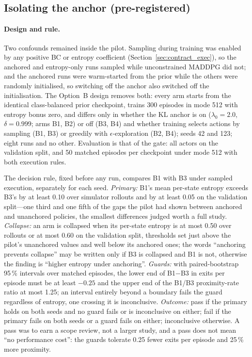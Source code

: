 \subsection{Isolating the anchor (pre-registered)}
\label{sec:anchor}

\paragraph{Design and rule.}
Two confounds remained inside the pilot. Sampling during training was enabled by any positive BC or entropy coefficient (Section~\ref{sec:contract_exec}), so the anchored and entropy-only runs sampled while unconstrained MADDPG did not; and the anchored runs were warm-started from the prior while the others were randomly initialised, so switching off the anchor also switched off the initialisation. The Option~B design removes both: every arm starts from the identical class-balanced prior checkpoint, trains 300 episodes in mode 512 with entropy bonus zero, and differs only in whether the KL anchor is on ($\lambda_0=2.0$, $\delta=0.999$; arms B1, B2) or off (B3, B4) and whether training selects actions by sampling (B1, B3) or greedily with $\epsilon$-exploration (B2, B4); seeds 42 and 123; eight runs and no other. Evaluation is that of the gate: all actors on the validation split, and 50 matched episodes per checkpoint under mode 512 with both execution rules.

The decision rule, fixed before any run, compares B1 with B3 under sampled execution, separately for each seed. \emph{Primary:} B1's mean per-state entropy exceeds B3's by at least 0.10 over simulator rollouts and by at least 0.05 on the validation split---one third and one fifth of the gaps the pilot had shown between anchored and unanchored policies, the smallest differences judged worth a full study. \emph{Collapse:} an arm is collapsed when its per-state entropy is at most 0.50 over rollouts or at most 0.60 on the validation split, thresholds set just above the pilot's unanchored values and well below its anchored ones; the words ``anchoring prevents collapse'' may be written only if B3 is collapsed and B1 is not, otherwise the finding is ``higher entropy under anchoring''. \emph{Guards:} with paired-bootstrap 95\,\% intervals over matched episodes, the lower end of B1$-$B3 in exits per episode must be at least $-0.25$ and the upper end of the B1/B3 proximity-rate ratio at most 1.25; an interval entirely beyond a boundary fails the guard regardless of entropy, one crossing it is inconclusive. \emph{Outcome:} pass if the primary holds on both seeds and no guard fails or is inconclusive on either; fail if the primary fails on both seeds or a guard fails on either; inconclusive otherwise. A pass was to earn a scope review, not a larger study, and a pass does not mean ``no performance cost'': the guards tolerate 0.25 fewer exits per episode and 25\,\% more proximity.

